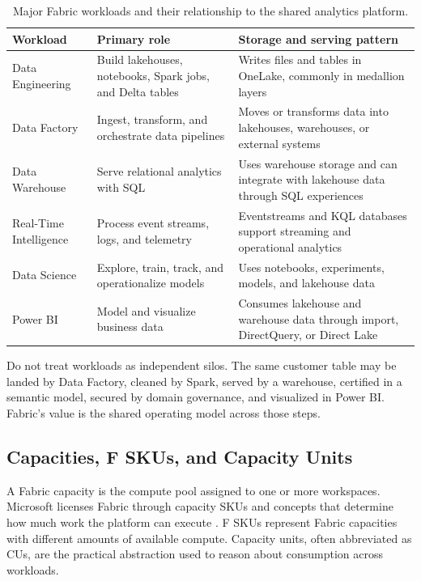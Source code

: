 \begin{table}[H]
\centering
\small
\begin{tabular}{@{}p{3.2cm}p{5.6cm}p{5.2cm}@{}}
\toprule
\textbf{Workload} & \textbf{Primary role} & \textbf{Storage and serving pattern} \\
\midrule
Data Engineering & Build lakehouses, notebooks, Spark jobs, and Delta tables & Writes files and tables in OneLake, commonly in medallion layers \\
Data Factory & Ingest, transform, and orchestrate data pipelines & Moves or transforms data into lakehouses, warehouses, or external systems \\
Data Warehouse & Serve relational analytics with SQL & Uses warehouse storage and can integrate with lakehouse data through SQL experiences \\
Real-Time Intelligence & Process event streams, logs, and telemetry & Eventstreams and KQL databases support streaming and operational analytics \\
Data Science & Explore, train, track, and operationalize models & Uses notebooks, experiments, models, and lakehouse data \\
Power BI & Model and visualize business data & Consumes lakehouse and warehouse data through import, DirectQuery, or Direct Lake \\
\bottomrule
\end{tabular}
\caption{Major Fabric workloads and their relationship to the shared analytics platform.}
\label{tab:chapter1-workloads}
\end{table}

\begin{notebox}
Do not treat workloads as independent silos. The same customer table may be landed by Data Factory, cleaned by Spark, served by a warehouse, certified in a semantic model, secured by domain governance, and visualized in Power BI. Fabric's value is the shared operating model across those steps.
\end{notebox}

\subsection{Capacities, F SKUs, and Capacity Units}
A Fabric capacity is the compute pool assigned to one or more workspaces. Microsoft licenses Fabric through capacity SKUs and concepts that determine how much work the platform can execute \cite{microsoftFabricCapacity}. F SKUs represent Fabric capacities with different amounts of available compute. Capacity units, often abbreviated as CUs, are the practical abstraction used to reason about consumption across workloads.

